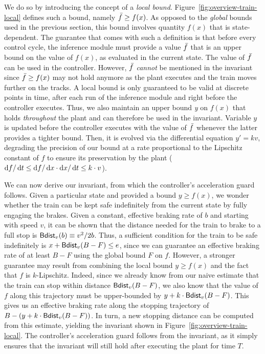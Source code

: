 \documentclass[acmsmall,screen,nonacm]{acmart}
\begin{document}


We do so by introducing the concept of a \emph{local bound}. Figure~\ref{fig:overview-train-local} defines such a  bound, namely $\bar {f} \ge f(x)$. As opposed to the \emph{global} bounds used in the previous section, this bound involves quantity $f(x)$ that is state-dependent. The guarantee that comes with such a definition is that before every control cycle, the inference module must provide a value $\bar {f}$ that is an upper bound on the value of $f(x)$, as evaluated in the current state. The value of $\bar {f}$ can be used in the controller. However, $\bar {f}$ \emph{cannot} be mentioned in the invariant since $\bar {f} \ge f(x)$ may not hold anymore as the plant executes and the train moves further on the tracks. A local bound is only guaranteed to be valid at discrete points in time, after each run of the inference module and right before the controller executes. Thus, we also maintain an upper bound \emph{y} on $f(x)$ that holds \emph{throughout} the plant and can therefore be used in the invariant. Variable $y$ is updated before the controller executes with the value of $\bar {f}$ whenever the latter provides a tighter bound. Then, it is evolved via the differential equation $y'=kv$, degrading the precision of our bound at a rate proportional to the Lipschitz constant of $f$ to ensure its preservation by the plant ($\mathop{}\!\mathrm{d} f/\mathop{}\!\mathrm{d} t \le \mathop{}\!\mathrm{d} f / \mathop{}\!\mathrm{d} x \cdot \mathop{}\!\mathrm{d} x / \mathop{}\!\mathrm{d} t \le k \cdot v$).

We can now derive our invariant, from which the controller's acceleration guard follows. Given a particular state and provided a bound $y \ge f(x)$, we wonder whether the train can be kept safe indefinitely from the current state by fully engaging the brakes. Given a constant, {effective} braking rate of $b$ and starting with speed $v$, it can be shown that the distance needed for the train to brake to a full stop is $\textsf{Bdist}_{v}(b) \equiv v^2/2b$. %
Thus, a sufficient condition for the train to be safe indefinitely is $x + \textsf{Bdist}_{v}(B-F) \le e$, since we can guarantee an effective braking rate of at least $B-F$ using the global bound $F$ on $f$. However, a stronger guarantee may result from combining the local bound $y \ge f(x)$ and the fact that $f$ is $k$-Lipschitz. Indeed, since we already know from our naive estimate that the train can stop within distance $\textsf{Bdist}_{v}(B-F)$, we also know that the value of $f$ along this trajectory must be upper-bounded by $y + k \cdot \textsf{Bdist}_{v}(B-F)$. This gives us an effective braking rate along the stopping trajectory of $B - (y + k \cdot \textsf{Bdist}_{v}(B-F))$. In turn, a new stopping distance can be computed from this estimate, yielding the invariant shown in Figure~\ref{fig:overview-train-local}. The controller's acceleration guard follows from the invariant, as it simply ensures that the invariant will still hold after executing the plant for time $T$.
\end{document}
